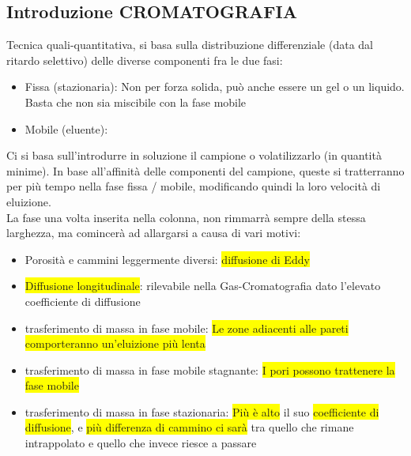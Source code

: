 \documentclass{article}
\begin{document}
\newpage

\subsection{Introduzione CROMATOGRAFIA}
Tecnica quali-quantitativa, si basa sulla distribuzione differenziale (data dal ritardo selettivo) delle diverse componenti fra le due fasi:
\begin{itemize}
	\item Fissa (stazionaria): Non per forza solida, può anche essere un gel o un liquido. Basta che non sia miscibile con la fase mobile
	\item Mobile (eluente): 
\end{itemize}
Ci si basa sull'introdurre in soluzione il campione o volatilizzarlo (in quantità minime). In base all'affinità delle componenti del campione, queste si tratterranno per più tempo nella fase fissa / mobile, modificando quindi la loro velocità di eluizione.
\\
La fase una volta inserita nella colonna, non rimmarrà sempre della stessa larghezza, ma comincerà ad allargarsi a causa di vari motivi:
\begin{itemize}
	\item Porosità e cammini leggermente diversi: \colorbox{yellow}{diffusione di Eddy}
	\item \colorbox{yellow}{Diffusione longitudinale}: rilevabile nella Gas-Cromatografia dato l'elevato coefficiente di diffusione
	\item trasferimento di massa in fase mobile: \colorbox{yellow}{Le zone adiacenti alle pareti comporteranno un'eluizione più lenta}
	\item trasferimento di massa in fase mobile stagnante: \colorbox{yellow}{I pori possono trattenere la fase mobile }
	\item trasferimento di massa in fase stazionaria: \colorbox{yellow}{Più è alto} il suo \colorbox{yellow}{coefficiente di diffusione}, e \colorbox{yellow}{più differenza di cammino ci sarà} tra quello che rimane intrappolato e quello che invece riesce a passare 
\end{itemize}
\end{document}
